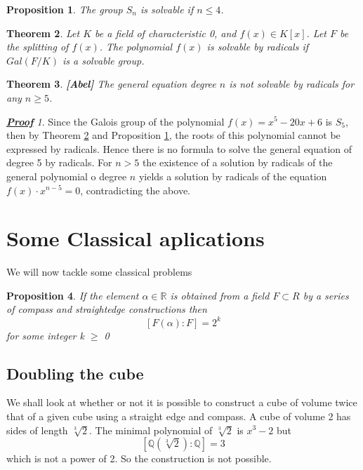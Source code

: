 \documentclass[a4paper, 10pt]{article}
\theoremstyle{plain}
\newtheorem{teorema}{Theorem}[section]
\newtheorem{proposicion}[teorema]{Proposition}
\theoremstyle{definition}
\theoremstyle{remark}
\newtheorem*{prueba}{\textbf{\textit{\underline{Proof}}}}
\begin{document}
    \begin{proposicion}\label{need}
        The group $S_n$ is solvable if $n\leq 4$.
    \end{proposicion}

    \begin{teorema}\label{paabel}
        Let $K$ be a field of characteristic 0, and $f(x)\in K[x]$. Let $F$ be the splitting of $f(x)$. The polynomial $f(x)$ is solvable by radicals if $Gal(F/K)$ is a solvable group.
    \end{teorema}

    \begin{teorema}
        \textbf{[Abel]} The general equation degree $n$ is not solvable by radicals for any $n\geq 5$.
    \end{teorema}

    \begin{prueba}
        Since the Galois group of the polynomial $f(x)=x^5-20x+6$ is $S_5$, then by Theorem \ref{paabel} and Proposition \ref{need}, the roots of this polynomial cannot be expressed by radicals. Hence there is no formula to solve the general equation of degree 5 by radicals. For $n>5$ the existence of a solution by radicals of the general polynomial o degree $n$ yields a solution by radicals of the equation $f(x)\cdot x^{n-5}=0$, contradicting the above.
    \end{prueba}
    
	\section{Some Classical aplications}
 We will now tackle some classical problems
 \begin{proposicion}
     If the element $\alpha \in \mathbb R$ is obtained from a field $F \subset R$ by a series of compass and straightedge constructions then $$[F(\alpha) : F] = 2^k$$
     for some integer k $\geq$ 0
 \end{proposicion}
 \subsection{Doubling the cube}
 We shall look at whether or not it is possible to construct a cube of volume twice that of a given cube using a straight edge and compass. A cube of volume 2 has sides of length $\sqrt[3]{2}$. The minimal polynomial of $\sqrt[3]{2}$ is $x^3 - 2$ but $$[\mathbb{Q}(\sqrt[3]{2}) : \mathbb{Q}] = 3$$ which is not a power of 2. So the construction is not possible.
\end{document}
